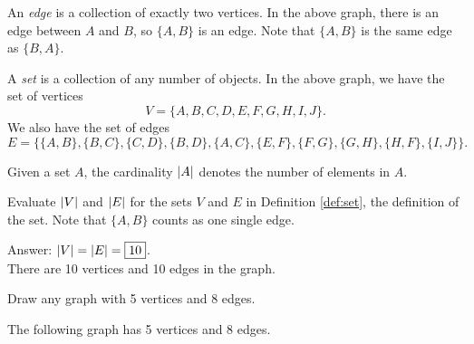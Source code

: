 \documentclass[11pt]{article}
\begin{document}
\begin{definition}
\label{def:edge}
An \textit{edge} is a collection of exactly two vertices. In the above graph, there is an edge
between $A$ and $B$, so $\{A, B\}$ is an edge. Note that $\{A,B\}$ is the same edge as $\{B,A\}$.
\end{definition}

\begin{definition}
\label{def:set}
A \textit{set} is a collection of any number of objects. In the above graph, we have the set of vertices
\[V=\{A, B, C, D, E, F, G, H, I, J\}.\]
We also have the set of edges
\[E=\{\{A,B\}, \{B,C\}, \{C,D\},\{B,D\},\{A,C\},\{E,F\},\{F,G\},\{G,H\},\{H,F\},\{I,J\} \}.\]
\end{definition}

\begin{definition}
\label{def:cardinality}
Given a set $A$, the cardinality $\left\lvert A \right\rvert$ denotes the number of elements in $A$.
\end{definition}

\begin{problem} %
Evaluate $\left\lvert V \right\rvert$ and $\left\lvert E \right\rvert$ for the sets $V$ and $E$ in Definition \ref{def:set}, the definition of the set.
Note that $\{A,B\}$ counts as one single edge.
\end{problem}

\begin{solution}
Answer: $\left\lvert V \right\rvert = \left\lvert E \right\rvert = \boxed{10}$. \\
There are 10 vertices and 10 edges in the graph.
\end{solution}

\begin{problem} %
Draw any graph with 5 vertices and 8 edges.
\end{problem}

\begin{solution}
The following graph has 5 vertices and 8 edges.
\begin{center}
\end{center}
\end{solution}
\end{document}
